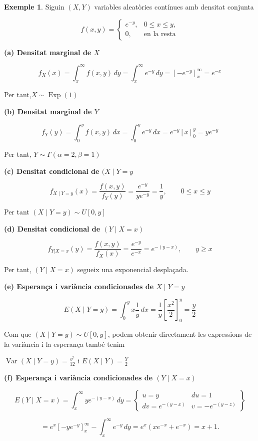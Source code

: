 \documentclass[
  catalan,
]{article}
\theoremstyle{definition}
\theoremstyle{definition}
\newtheorem{example}{Exemple}[section]
\theoremstyle{definition}
\theoremstyle{definition}
\theoremstyle{remark}
\begin{document}
\begin{example}
Siguin \((X, Y)\) variables aleatòries contínues amb densitat conjunta

\[
f(x,y)=
\begin{cases}
e^{-y}, & 0\le x\le y,\\
0, & \text{en la resta}
\end{cases}
\]

\textbf{(a) Densitat marginal de \(X\)}

\[
f_X(x)=\int_x^\infty f(x,y)\,dy=\int_x^\infty e^{-y}\,dy=\left[-e^{-y}\right]_x^\infty=e^{-x}
\]

Per tant,\(X\sim\operatorname{Exp}(1)\)

\textbf{(b) Densitat marginal de \(Y\)}

\[
f_Y(y)=\int_0^y f(x,y)\,dx=\int_0^y e^{-y}\,dx=e^{-y}[x]_0^y=ye^{-y}
\]

Per tant, \(Y\sim\Gamma(\alpha=2,\beta=1)\)

\textbf{(c) Densitat condicional de \((X\mid Y=y\)}

\[
f_{X\mid Y=y}(x)=\frac{f(x,y)}{f_Y(y)}=\frac{e^{-y}}{ye^{-y}}=\frac1y,\qquad 0\le x\le y
\]

Per tant \((X\mid Y=y)\sim U[0,y]\)

\textbf{(d) Densitat condicional de \((Y\mid X=x)\)}

\[
f_{Y|X=x}(y)=\frac{f(x,y)}{f_X(x)}=\frac{e^{-y}}{e^{-x}}=e^{-(y-x)},\qquad y\ge x
\]

Per tant, \((Y\mid X=x)\) segueix una exponencial desplaçada.

\textbf{(e) Esperança i variància condicionades de \(X\mid Y=y\)}

\[
E(X\mid Y=y) =\int_0^y x\frac1y\,dx=\frac1y\left[\frac{x^2}{2}\right]_0^y=\frac{y}{2}
\]

Com que \((X\mid Y=y)\sim U[0,y]\), podem obtenir directament les expressions de la variància i la esperança
també tenim

\(\operatorname{Var}(X\mid Y=y)=\frac{y^2}{12}\) i \(E(X\mid Y)=\frac{Y}{2}\)

\textbf{(f) Esperança i variància condicionades de \((Y\mid X=x)\)}

\[
E(Y\mid X=x)
=
\int_x^\infty ye^{-(y-x)}\,dy
=
\left\{
\begin{array}{ll}
u=y & du=1\\
dv=e^{-(y-x)} & v=-e^{-(y-z)}
\end{array}
\right \}
\]

\[
=e^x\left[-ye^{-y}\right]_x^\infty
-\int_x^\infty e^{-y}\,dy
=e^x\left(xe^{-x}+e^{-x}\right)
=x+1.
\]


\end{example}
\end{document}
